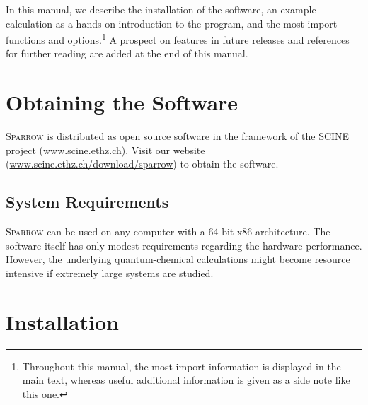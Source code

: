 \documentclass[]{tufte-book}
\begin{document}
In this manual, we describe the installation of the software, an example calculation as a hands-on 
introduction to the program, and the most import functions and options.\footnote{Throughout this manual, the most 
import information is displayed in the main text, whereas useful additional information is given as a side note like this one.}
A prospect on features in future releases and references for further reading are added at the end of this manual.\enlargethispage{\baselineskip}



\chapter{Obtaining the Software}
\label{ch:obtain}

\textsc{Sparrow}  is distributed as open source software in the framework of the SCINE project (\href{https://scine.ethz.ch/}{www.scine.ethz.ch}).
Visit our website (\href{https://scine.ethz.ch/download/sparrow}{www.scine.ethz.ch/download/sparrow}) to obtain the software. 

\section{System Requirements}

\textsc{Sparrow} can be used on any computer with a 64-bit x86 architecture. The software itself has only modest requirements
regarding the hardware performance. However, the underlying quantum-chemical calculations might become resource intensive 
if extremely large systems are studied.



\chapter[Installation]{Installation}
\label{ch:installation}
\end{document}
